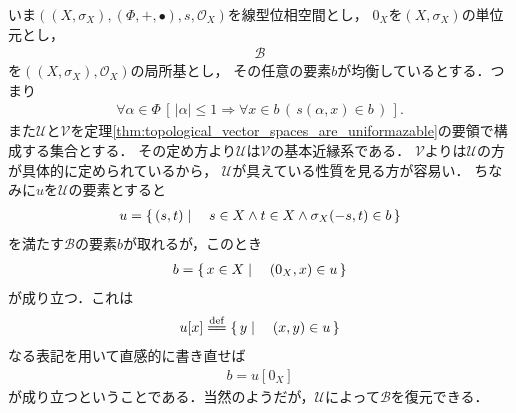 	いま$\left(\left(X,\sigma_X\right),(\Phi,+,\bullet),s,\mathscr{O}_X\right)$を線型位相空間とし，
	$0_X$を$\left(X,\sigma_X\right)$の単位元とし，
	\begin{align}
		\mathscr{B}
	\end{align}
	を$\left(\left(X,\sigma_X\right),\mathscr{O}_X\right)$の局所基とし，
	その任意の要素$b$が均衡しているとする．つまり
	\begin{align}
		\forall \alpha \in \Phi\,
		\left[\, |\alpha| \leq 1 \Longrightarrow \forall x \in b\, \left(\, s(\alpha,x) \in b\, \right)\, \right].
	\end{align}
	また$\mathscr{U}$と$\mathscr{V}$を定理\ref{thm:topological_vector_spaces_are_uniformazable}の要領で構成する集合とする．
	その定め方より$\mathscr{U}$は$\mathscr{V}$の基本近縁系である．
	$\mathscr{V}$よりは$\mathscr{U}$の方が具体的に定められているから，
	$\mathscr{U}$が具えている性質を見る方が容易い．
	ちなみに$u$を$\mathscr{U}$の要素とすると
	\begin{align}
		u = \left\{\, (s,t) \mid \quad s \in X \wedge t \in X \wedge \sigma_X(-s,t) \in b\, \right\}
	\end{align}
	を満たす$\mathscr{B}$の要素$b$が取れるが，このとき
	\begin{align}
		b = \left\{\, x \in X \mid \quad \left(0_X,x\right) \in u\, \right\}
	\end{align}
	が成り立つ．これは
	\begin{align}
		u[x] \defeq \Set{y}{(x,y) \in u}
	\end{align}
	なる表記を用いて直感的に書き直せば
	\begin{align}
		b = u[0_X]
	\end{align}
	が成り立つということである．当然のようだが，$\mathscr{U}$によって$\mathscr{B}$を復元できる．
	
